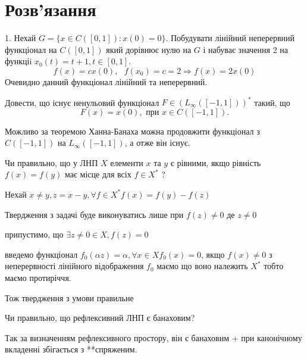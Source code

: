 \section*{Розв'язання}


\begin{tcolorbox}[title=Завдлання 1]
    1. Нехай $G=\{x \in C([0,1]): x(0)=0\}$. 
    Побудувати лінійний неперервний функціонал на $C([0,1])$ який дорівнює нулю на $G$ 
    і набуває значення 2 на функціi $x_0(t)=t+1, t \in[0,1]$.
    $$f(x) = c x(0), \text{ } f(x_0) = c = 2 \Rightarrow f(x) = 2 x(0)$$
    Очевидно данний функціонал лінійний та неперервний.
\end{tcolorbox}

\begin{tcolorbox}[title=Завдлання 2]
    Довести, що існує ненульовий функціонал $F \in(L_{\infty}([-1,1]))^*$ такий, що
    $$
    F(x)=x(0), \text { при } x \in C([-1,1]) .
    $$

    Можливо за теоремою Ханна-Банаха можна продовжити функціонал з $C([-1,1])$ на $L_{\infty}([-1,1])$, а отже він існує.
\end{tcolorbox}

\begin{tcolorbox}[title=Завдлання 3]
    Чи правильно, що у ЛНП $X$ елементи $x$ та $y$ є рівними, 
    якщо рівність $f(x)=f(y)$ має місце для всіх $f \in X^*$ ?
    

    Нехай $x \neq y, z = x-y, \forall f \in X^* f(x) = f(y) - f(z)$


    Твердження з задачі буде виконуватись лише при $f(z) \neq 0$ де $z \neq 0$

    припустимо, що $\exists z\neq 0 \in X, f(z) = 0 $


    введемо функціонал $f_0(\alpha z) = \alpha, \forall x \in X f_0(x) = 0$, якщо 
    $f(x) \neq 0$
    з неперервності лінійного відображення $f_0$ маємо що воно належить $X^*$ тобто маємо 
    протиріччя.


    Тож твердження з умови правильне
\end{tcolorbox}

\begin{tcolorbox}[title=Завдлання 4]
    Чи правильно, що рефлексивний ЛНП є банаховим?
    

    Так за визначенням рефлексивного простору, він є банаховим + при канонічному вкладенні
    збігається з **спряженим.
\end{tcolorbox}